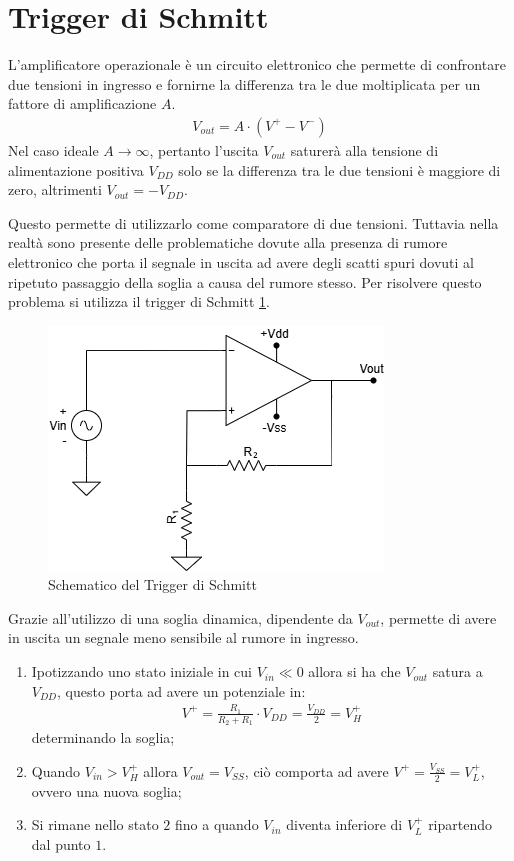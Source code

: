 \documentclass[a4paper,12pt]{article}
\begin{document}


\section*{Trigger di Schmitt} 
L'amplificatore operazionale è un circuito elettronico che permette di confrontare due tensioni in ingresso e fornirne la differenza tra le due moltiplicata per un fattore di amplificazione $A$.
\begin{align*}
    V_{out} = A \cdot (V^+ - V^-)
\end{align*} 
Nel caso ideale $ A \rightarrow \infty $, pertanto l'uscita $V_{out}$ saturerà alla tensione di alimentazione positiva $V_{DD}$ solo se la differenza tra le due tensioni è maggiore di zero, altrimenti $V_{out} = -V_{DD}$.

Questo permette di utilizzarlo come comparatore di due tensioni. Tuttavia nella realtà sono presente delle problematiche dovute alla presenza di rumore elettronico che porta il segnale in uscita ad avere degli scatti spuri dovuti al ripetuto passaggio della soglia a causa del rumore stesso.
Per risolvere questo problema si utilizza il trigger di Schmitt \ref{fig:trigger_schmitt}.

\begin{figure}[h]
    \centering
    \includegraphics[width = 0.4\linewidth]{./immagini/schmitt/circuito.png}
    \caption{Schematico del Trigger di Schmitt}
    \label{fig:trigger_schmitt}
\end{figure}

Grazie all'utilizzo di una soglia dinamica, dipendente da $V_{out}$, permette di avere in uscita un segnale meno sensibile al rumore in ingresso.
\begin{enumerate}
    \item Ipotizzando uno stato iniziale in cui $V_{in} \ll 0$ allora si ha che $V_{out}$ satura a $V_{DD}$, questo porta ad avere un potenziale in:
    \begin{align*}
        V^+ = \frac{R_1}{R_2 + R_1} \cdot V_{DD} = \frac{V_{DD}}{2} = V^+_H
    \end{align*}
    determinando la soglia;
    \item Quando $V_{in} > V^+_H$ allora $V_{out} = V_{SS}$, ciò comporta ad avere $V^+ = \frac{V_{SS}}{2} = V^+_L$, ovvero una nuova soglia;
    \item Si rimane nello stato $2$ fino a quando $V_{in}$ diventa inferiore di $V^+_L$ ripartendo dal punto $1$.  
\end{enumerate} 
\end{document}

